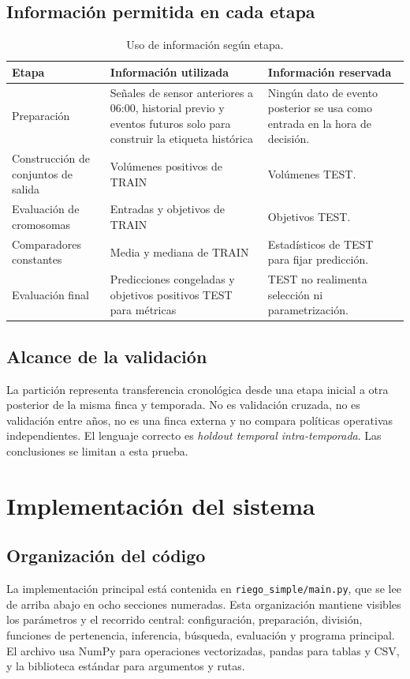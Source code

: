 \documentclass[11pt,letterpaper]{article}
\newcommand{\codigo}[1]{\texttt{\small #1}}
\begin{document}
\subsection{Información permitida en cada etapa}
\begin{table}[H]
\centering\small
\caption{Uso de información según etapa.}\label{tab:uso-info}
\begin{tabularx}{\textwidth}{p{3cm}X X}
\toprule
Etapa & Información utilizada & Información reservada\\
\midrule
Preparación & Señales de sensor anteriores a 06:00, historial previo y eventos futuros solo para construir la etiqueta histórica & Ningún dato de evento posterior se usa como entrada en la hora de decisión.\\
Construcción de conjuntos de salida & Volúmenes positivos de TRAIN & Volúmenes TEST.\\
Evaluación de cromosomas & Entradas y objetivos de TRAIN & Objetivos TEST.\\
Comparadores constantes & Media y mediana de TRAIN & Estadísticos de TEST para fijar predicción.\\
Evaluación final & Predicciones congeladas y objetivos positivos TEST para métricas & TEST no realimenta selección ni parametrización.\\
\bottomrule
\end{tabularx}
\end{table}

\subsection{Alcance de la validación}
La partición representa transferencia cronológica desde una etapa inicial a otra posterior de la misma finca y temporada. No es validación cruzada, no es validación entre años, no es una finca externa y no compara políticas operativas independientes. El lenguaje correcto es \emph{holdout temporal intra-temporada}. Las conclusiones se limitan a esta prueba.

\section{Implementación del sistema}
\subsection{Organización del código}
La implementación principal está contenida en \codigo{riego\_simple/main.py}, que se lee de arriba abajo en ocho secciones numeradas. Esta organización mantiene visibles los parámetros y el recorrido central: configuración, preparación, división, funciones de pertenencia, inferencia, búsqueda, evaluación y programa principal. El archivo usa NumPy para operaciones vectorizadas, pandas para tablas y CSV, y la biblioteca estándar para argumentos y rutas.
\end{document}
